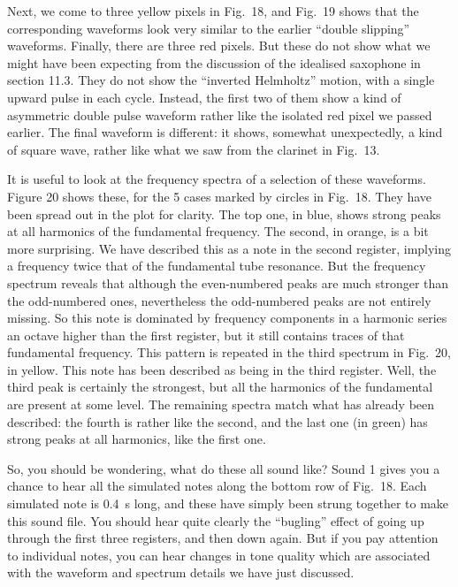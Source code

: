   Next, we come to three yellow pixels in Fig.\ 18, and Fig.\ 19 shows that the 
  corresponding waveforms look very similar to the earlier “double slipping” 
  waveforms. Finally, there are three red pixels. But these do not show what we 
  might have been expecting from the discussion of the idealised saxophone in 
  section 11.3. They do not show the “inverted Helmholtz” motion, with a single 
  upward pulse in each cycle. Instead, the first two of them show a kind of 
  asymmetric double pulse waveform rather like the isolated red pixel we passed 
  earlier. The final waveform is different: it shows, somewhat unexpectedly, a 
  kind of square wave, rather like what we saw from the clarinet in Fig.\ 13. 

  It is useful to look at the frequency spectra of a selection of these 
  waveforms. Figure 20 shows these, for the 5 cases marked by circles in Fig.\ 
  18. They have been spread out in the plot for clarity. The top one, in blue, 
  shows strong peaks at all harmonics of the fundamental frequency. The second, 
  in orange, is a bit more surprising. We have described this as a note in the 
  second register, implying a frequency twice that of the fundamental tube 
  resonance. But the frequency spectrum reveals that although the even-numbered 
  peaks are much stronger than the odd-numbered ones, nevertheless the 
  odd-numbered peaks are not entirely missing. So this note is dominated by 
  frequency components in a harmonic series an octave higher than the first 
  register, but it still contains traces of that fundamental frequency. This 
  pattern is repeated in the third spectrum in Fig.\ 20, in yellow. This note 
  has been described as being in the third register. Well, the third peak is 
  certainly the strongest, but all the harmonics of the fundamental are present 
  at some level. The remaining spectra match what has already been described: 
  the fourth is rather like the second, and the last one (in green) has strong 
  peaks at all harmonics, like the first one. 

  So, you should be wondering, what do these all sound like? Sound 1 gives you 
  a chance to hear all the simulated notes along the bottom row of Fig.\ 18. 
  Each simulated note is 0.4~s long, and these have simply been strung together 
  to make this sound file. You should hear quite clearly the “bugling” effect 
  of going up through the first three registers, and then down again. But if 
  you pay attention to individual notes, you can hear changes in tone quality 
  which are associated with the waveform and spectrum details we have just 
  discussed. 

